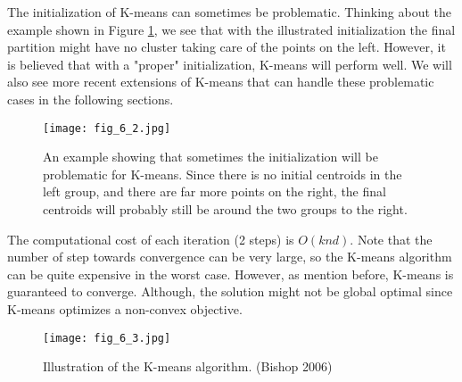 \documentclass[../book-template.tex]{subfiles}
\begin{document}
\begin{remark}
	The initialization of K-means can sometimes be problematic. Thinking about the example shown in Figure \ref{fig_6_2}, we see that with the illustrated initialization the final partition might have no cluster taking care of the points on the left. However, it is believed that with a "proper" initialization, K-means will perform well. We will also see more recent extensions of K-means that can handle these problematic cases in the following sections.
	 \begin{figure}[h] 
	 	\centering 
	 	\texttt{[image: fig\_6\_2.jpg]} 
	 	\caption{An example showing that sometimes the initialization will be problematic for K-means. Since there is no initial centroids in the left group, and there are far more points on the right, the final centroids will probably still be around the two groups to the right.}\label{fig_6_2}
	 \end{figure}
\end{remark}
\par The computational cost of each iteration (2 steps) is $O(knd)$. Note that the number of step towards convergence can be very large, so the K-means algorithm can be quite expensive in the worst case. However, as mention before, K-means is guaranteed to converge. Although, the solution might not be global optimal since K-means optimizes a non-convex objective.
\begin{figure}[t] 
	\centering 
	\texttt{[image: fig\_6\_3.jpg]} 
	\caption{Illustration of the K-means algorithm. (Bishop 2006)}\label{fig_6_3}
\end{figure}
\end{document}
